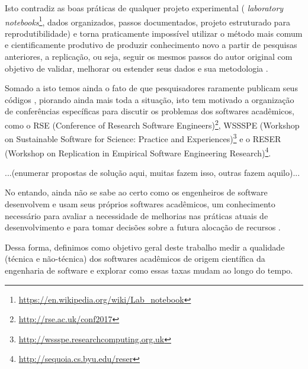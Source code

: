 Isto contradiz as boas práticas de qualquer projeto experimental ({\it
laboratory
notebooks}\footnote{\url{https://en.wikipedia.org/wiki/Lab_notebook}}, dados
organizados, passos documentados, projeto estruturado para reprodutibilidade) e
torna praticamente impossível utilizar o método mais comum e cientificamente
produtivo de produzir conhecimento novo a partir de pesquisas anteriores, a
replicação, ou seja, seguir os mesmos passos do autor original com objetivo de
validar, melhorar ou estender seus dados e sua metodologia
\cite{king1995replication, Stodden2010}.

Somado a isto temos ainda o fato de que pesquisadores raramente publicam seus
códigos \cite{robles2010replicating, amann2015software}, piorando ainda mais toda a situação, isto tem motivado a organização
de conferências específicas para discutir os problemas dos softwares
acadêmicos, como o RSE (Conference of Research Software Engineers)\footnote{
\url{http://rse.ac.uk/conf2017}}, WSSSPE (Workshop on Sustainable Software for
Science: Practice and Experiences)\footnote{
\url{http://wssspe.researchcomputing.org.uk}} e o RESER (Workshop on
Replication in Empirical Software Engineering Research)\footnote{
\url{http://sequoia.cs.byu.edu/reser}}.

...(enumerar propostas de solução aqui, muitas fazem isso, outras fazem aquilo)...


No entando, ainda não se sabe ao certo como os engenheiros de software
desenvolvem e usam seus próprios softwares acadêmicos, um conhecimento necessário
para avaliar a necessidade de melhorias nas práticas atuais de desenvolvimento
e para tomar decisões sobre a futura alocação de recursos
\cite{hannay2009scientists}.


Dessa forma, definimos como objetivo geral deste trabalho medir a qualidade
(técnica e não-técnica) dos softwares acadêmicos de origem científica da
engenharia de software e explorar como essas taxas mudam ao longo do tempo.

